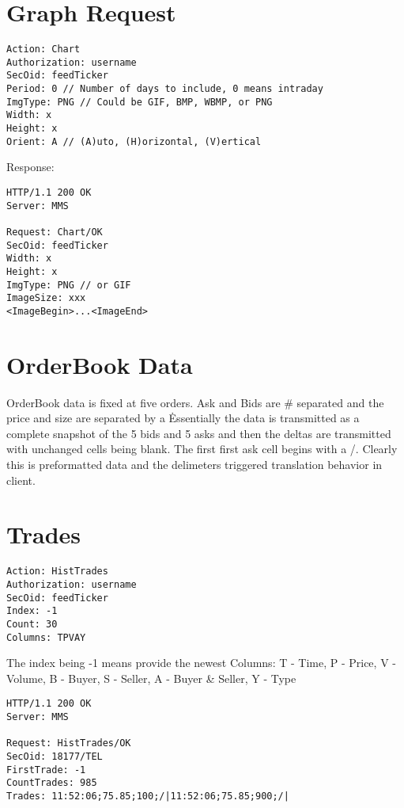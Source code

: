 \documentclass[12pt,twoside,letterpaper]{report}
\begin{document}
\section*{Graph Request}
\begin{verbatim}
Action: Chart
Authorization: username
SecOid: feedTicker
Period: 0 // Number of days to include, 0 means intraday
ImgType: PNG // Could be GIF, BMP, WBMP, or PNG
Width: x
Height: x
Orient: A // (A)uto, (H)orizontal, (V)ertical
\end{verbatim}

Response:
\begin{verbatim}
HTTP/1.1 200 OK
Server: MMS

Request: Chart/OK
SecOid: feedTicker
Width: x
Height: x
ImgType: PNG // or GIF
ImageSize: xxx
<ImageBegin>...<ImageEnd>
\end{verbatim}


\section*{OrderBook Data}
OrderBook data is fixed at five orders. Ask and Bids are # separated and the price and size are separated by a \. Essentially the data is transmitted as a complete
snapshot of the 5 bids and 5 asks and then the deltas are transmitted with unchanged cells being blank. The first first ask cell begins with a /. Clearly this is
preformatted data and the delimeters triggered translation behavior in client.

\section*{Trades}
\begin{verbatim}
Action: HistTrades
Authorization: username
SecOid: feedTicker
Index: -1
Count: 30
Columns: TPVAY
\end{verbatim}

The index being -1 means provide the newest
Columns: T - Time, P - Price, V - Volume, B - Buyer, S - Seller, A - Buyer & Seller, Y - Type 

\begin{verbatim}
HTTP/1.1 200 OK
Server: MMS

Request: HistTrades/OK
SecOid: 18177/TEL
FirstTrade: -1
CountTrades: 985
Trades: 11:52:06;75.85;100;/|11:52:06;75.85;900;/|
\end{verbatim}
\end{document}
